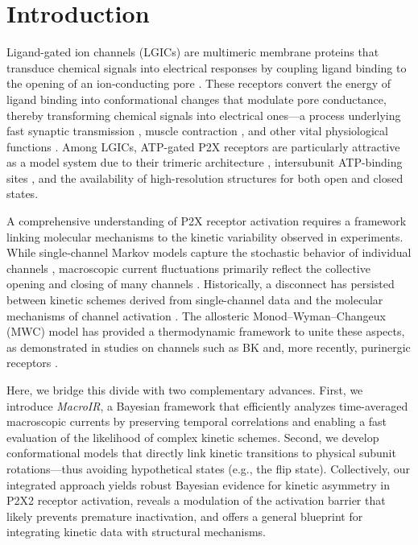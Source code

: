 \documentclass[pdflatex,sn-nature]{sn-jnl}%
\theoremstyle{thmstyleone}%
\theoremstyle{thmstyletwo}%
\theoremstyle{thmstylethree}%
\begin{document}

\maketitle
\section{Introduction}

Ligand-gated ion channels (LGICs) are multimeric membrane proteins that transduce chemical signals into electrical responses by coupling ligand binding to the opening of an ion‐conducting pore \cite{Changeux1984AcetylcholineRA,UNWIN199331,Lemoine2012,galligan2002ligand,feske2012ion}. These receptors convert the energy of ligand binding into conformational changes that modulate pore conductance, thereby transforming chemical signals into electrical ones—a process underlying fast synaptic transmission \cite{nakanishi1994metabotropic,greengard2001neurobiology}, muscle contraction \cite{peper1982acetylcholine}, and other vital physiological functions \cite{burnstock2007physiology}. Among LGICs, ATP-gated P2X receptors are particularly attractive as a model system due to their trimeric architecture \cite{trimer}, intersubunit ATP-binding sites \cite{MarquezKlaka2007IdentificationOA}, and the availability of high-resolution structures for both open \cite{abierta_p2x} and closed \cite{cerrada_p2x} states.

A comprehensive understanding of P2X receptor activation requires a framework linking molecular mechanisms to the kinetic variability observed in experiments. While single-channel Markov models capture the stochastic behavior of individual channels \cite{properties_single_channe}, macroscopic current fluctuations primarily reflect the collective opening and closing of many channels \cite{Moffatt_hume}. Historically, a disconnect has persisted between kinetic schemes derived from single-channel data \cite{properties_single_channe} and the molecular mechanisms of channel activation \cite{Hattori2012MolecularMO}. The allosteric Monod–Wyman–Changeux (MWC) model \cite{Changeux1984AcetylcholineRA} has provided a thermodynamic framework to unite these aspects, as demonstrated in studies on channels such as BK \cite{Horrigan2002CouplingBV} and, more recently, purinergic receptors \cite{Moffatt_hume}.

Here, we bridge this divide with two complementary advances. First, we introduce \textit{MacroIR}, a Bayesian framework that efficiently analyzes time-averaged macroscopic currents by preserving temporal correlations and enabling a fast evaluation of the likelihood of complex kinetic schemes. Second, we develop conformational models that directly link kinetic transitions to physical subunit rotations—thus avoiding hypothetical states (e.g., the flip state).  Collectively, our integrated approach yields robust Bayesian evidence for kinetic asymmetry in P2X2 receptor activation, reveals a modulation of the activation barrier that likely prevents premature inactivation, and offers a general blueprint for integrating kinetic data with structural mechanisms.
\end{document}
